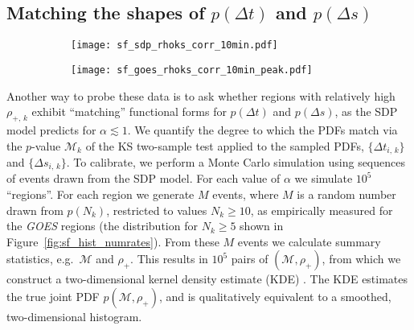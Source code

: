 \subsection{Matching the shapes of \texorpdfstring{$p(\Delta t)$}{p(Δt)} and \texorpdfstring{$p(\Delta s)$}{p(Δs)}} \label{sec:sf_matching}
\begin{figure}
\centering
\begin{subfigure}[t]{0.49\textwidth}
\texttt{[image: sf\_sdp\_rhoks\_corr\_10min.pdf]}
\label{fig:sf_sdp_kde}
\end{subfigure}
\hfill %
\begin{subfigure}[t]{0.49\textwidth}
\texttt{[image: sf\_goes\_rhoks\_corr\_10min\_peak.pdf]}
\label{fig:sf_goes_kde}
\end{subfigure}
\end{figure}

Another way to probe these data is to ask whether regions with relatively high $\rho_{+,\,k}$ exhibit ``matching'' functional forms for $p(\Delta t)$ and $p(\Delta s)$, as the SDP model predicts for $\alpha \lesssim 1$. We quantify the degree to which the PDFs match via the $p$-value $\mathcal{M}_k$ of the KS two-sample test applied to the sampled PDFs, $\{\Delta t_{i,\,k}\}$ and $\{\Delta s_{i,\,k}\}$. To calibrate, we perform a Monte Carlo simulation using sequences of events drawn from the SDP model. For each value of $\alpha$ we simulate $10^5$ ``regions''. For each region we generate $M$ events, where $M$ is a random number drawn from $p(N_k)$, restricted to values $N_k \geq 10$, as empirically measured for the \emph{GOES} regions (the distribution for $N_k \geq 5$ shown in Figure~\ref{fig:sf_hist_numrates}). From these $M$ events we calculate summary statistics, e.g.~$\mathcal{M}$ and $\rho_+$. This results in $10^5$ pairs of $(\mathcal{M}, \rho_{+})$, from which we construct a two-dimensional kernel density estimate (KDE) \citep{Wand1995}. The KDE estimates the true joint PDF $p(\mathcal{M}, \rho_{+})$, and is qualitatively equivalent to a smoothed, two-dimensional histogram.

